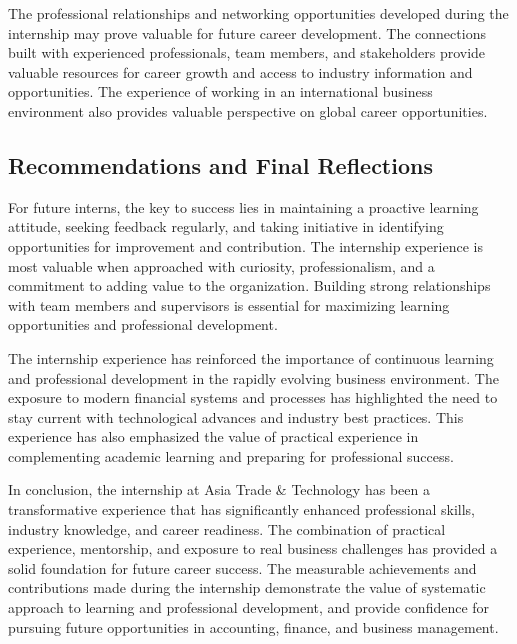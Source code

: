 The professional relationships and networking opportunities developed during the internship may prove valuable for future career development. The connections built with experienced professionals, team members, and stakeholders provide valuable resources for career growth and access to industry information and opportunities. The experience of working in an international business environment also provides valuable perspective on global career opportunities.

\subsection{Recommendations and Final Reflections}
For future interns, the key to success lies in maintaining a proactive learning attitude, seeking feedback regularly, and taking initiative in identifying opportunities for improvement and contribution. The internship experience is most valuable when approached with curiosity, professionalism, and a commitment to adding value to the organization. Building strong relationships with team members and supervisors is essential for maximizing learning opportunities and professional development.

The internship experience has reinforced the importance of continuous learning and professional development in the rapidly evolving business environment. The exposure to modern financial systems and processes has highlighted the need to stay current with technological advances and industry best practices. This experience has also emphasized the value of practical experience in complementing academic learning and preparing for professional success.

In conclusion, the internship at Asia Trade \& Technology has been a transformative experience that has significantly enhanced professional skills, industry knowledge, and career readiness. The combination of practical experience, mentorship, and exposure to real business challenges has provided a solid foundation for future career success. The measurable achievements and contributions made during the internship demonstrate the value of systematic approach to learning and professional development, and provide confidence for pursuing future opportunities in accounting, finance, and business management.
